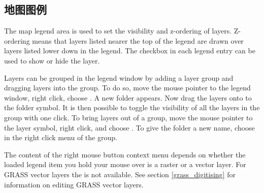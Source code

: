 \subsection{地图图例}\label{label_legend}

The map legend area is used to set the visibility and z-ordering of layers.
Z-ordering means that layers listed nearer the top of the legend are drawn
over layers listed lower down in the legend. The checkbox in each legend
entry can be used to show or hide the layer.

Layers can be grouped in the legend window by adding a layer group and dragging layers
into the group. To do so, move the mouse pointer to the legend window, right click, choose .
A new folder appears. Now drag the layers onto to the folder symbol. It is then possible to toggle the
visibility of all the layers in the group with one click. To bring layers out of a group, move
the mouse pointer to the layer symbol, right click, and choose . To give the folder a
new name, choose  in the right click menu of the group.

The content of the right mouse button context menu depends on whether the loaded legend item you hold your
mouse over is a raster or a vector layer. For GRASS vector layers the  is not
available. See section \ref{grass_digitising} for information on editing GRASS vector layers.

